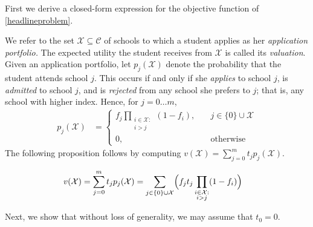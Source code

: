 First we derive a closed-form expression for the objective function of \eqref{headlineproblem}.

We refer to the set $\mathcal{X} \subseteq \mathcal{C}$ of schools to which a student applies as her \emph{application portfolio.} The expected utility the student receives from $\mathcal{X}$ is called its \emph{valuation}. Given an application portfolio, let $p_j(\mathcal{X})$ denote the probability that the student attends school $j$. This occurs if and only if she \emph{applies} to school $j$, is \emph{admitted} to school $j$, and is \emph{rejected} from any school she prefers to $j$; that is, any school with higher index. Hence, for $j= 0\dots m$,
\begin{align}
p_j(\mathcal{X}) &= 
\begin{cases}
\displaystyle f_j  \prod_{\substack{i \in \mathcal{X}: \\ i > j}} (1 - f_{i}), \quad & j \in \{0\}\cup\mathcal{X}\\
0, \quad & \text{otherwise}
\end{cases} 
\end{align}
The following proposition follows by computing $v(\mathcal{X}) = \sum_{j=0}^m  t_j p_j(\mathcal{X})$.
\begin{proposition}
\begin{align}
v(\mathcal{X}) &= \sum_{j=0}^m t_j p_j(\mathcal{X}) = \sum_{j\in\{0\}\cup\mathcal{X}} \Bigl( f_j t_j \prod_{\substack{i \in \mathcal{X}: \\ i > j}} (1 - f_{i}) \Bigr)  \label{closedformportfoliovaluationX}%
\end{align}
\end{proposition}

Next, we show that without loss of generality, we may assume that $t_0 = 0$.

